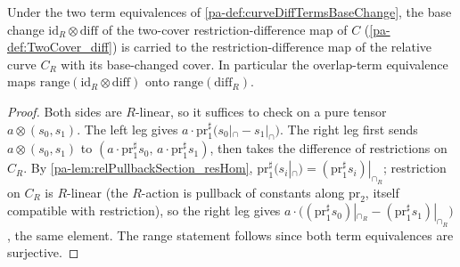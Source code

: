 \begin{theorem}
  \label{pa-thm:curveDiffBaseChange}
  \leanok

  Under the two term equivalences of \ref{pa-def:curveDiffTermsBaseChange}, the base
  change \(\mathrm{id}_R \otimes \mathrm{diff}\) of the two-cover
  restriction-difference map of \(C\) (\ref{pa-def:TwoCover_diff}) is carried to the
  restriction-difference map of the relative curve \(C_R\) with its base-changed cover.
  In particular the overlap-term equivalence maps
  \(\mathrm{range}(\mathrm{id}_R \otimes \mathrm{diff})\) onto
  \(\mathrm{range}(\mathrm{diff}_R)\).
\end{theorem}
\begin{proof}
  \leanok
  Both sides are \(R\)-linear, so it suffices to check on a pure tensor
  \(a \otimes (s_0, s_1)\). The left leg gives
  \(a \cdot \mathrm{pr}_1^\sharp\bigl(s_0|_\cap - s_1|_\cap\bigr)\). The right leg
  first sends \(a \otimes (s_0, s_1)\) to
  \((a \cdot \mathrm{pr}_1^\sharp s_0,\, a \cdot \mathrm{pr}_1^\sharp s_1)\), then takes
  the difference of restrictions on \(C_R\). By
  \ref{pa-lem:relPullbackSection_resHom}, \(\mathrm{pr}_1^\sharp(s_i|_\cap) =
  (\mathrm{pr}_1^\sharp s_i)|_{\cap_R}\); restriction on \(C_R\) is \(R\)-linear (the
  \(R\)-action is pullback of constants along \(\mathrm{pr}_2\), itself compatible with
  restriction), so the right leg gives
  \(a \cdot \bigl((\mathrm{pr}_1^\sharp s_0)|_{\cap_R} -
  (\mathrm{pr}_1^\sharp s_1)|_{\cap_R}\bigr)\), the same element. The range statement
  follows since both term equivalences are surjective.
\end{proof}

